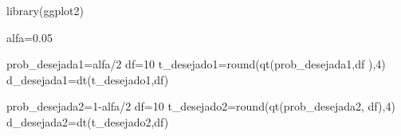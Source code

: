 \documentclass[
]{book}
\newenvironment{Shaded}{\begin{snugshade}}{\end{snugshade}}
\newcommand{\DecValTok}[1]{\textcolor[rgb]{0.00,0.00,0.81}{#1}}
\newcommand{\FloatTok}[1]{\textcolor[rgb]{0.00,0.00,0.81}{#1}}
\newcommand{\FunctionTok}[1]{\textcolor[rgb]{0.00,0.00,0.00}{#1}}
\newcommand{\NormalTok}[1]{#1}
\newcommand{\OtherTok}[1]{\textcolor[rgb]{0.56,0.35,0.01}{#1}}
\newcommand{\SpecialCharTok}[1]{\textcolor[rgb]{0.00,0.00,0.00}{#1}}
\begin{document}
\begin{Shaded}
\begin{Highlighting}[]
\FunctionTok{library}\NormalTok{(ggplot2)}

\NormalTok{alfa}\OtherTok{=}\FloatTok{0.05}

\NormalTok{prob\_desejada1}\OtherTok{=}\NormalTok{alfa}\SpecialCharTok{/}\DecValTok{2}
\NormalTok{df}\OtherTok{=}\DecValTok{10}
\NormalTok{t\_desejado1}\OtherTok{=}\FunctionTok{round}\NormalTok{(}\FunctionTok{qt}\NormalTok{(prob\_desejada1,df ),}\DecValTok{4}\NormalTok{)}
\NormalTok{d\_desejada1}\OtherTok{=}\FunctionTok{dt}\NormalTok{(t\_desejado1,df)}

\NormalTok{prob\_desejada2}\OtherTok{=}\DecValTok{1}\SpecialCharTok{{-}}\NormalTok{alfa}\SpecialCharTok{/}\DecValTok{2}
\NormalTok{df}\OtherTok{=}\DecValTok{10}
\NormalTok{t\_desejado2}\OtherTok{=}\FunctionTok{round}\NormalTok{(}\FunctionTok{qt}\NormalTok{(prob\_desejada2, df),}\DecValTok{4}\NormalTok{)}
\NormalTok{d\_desejada2}\OtherTok{=}\FunctionTok{dt}\NormalTok{(t\_desejado2,df)}



\end{Highlighting}
\end{Shaded}
\end{document}
